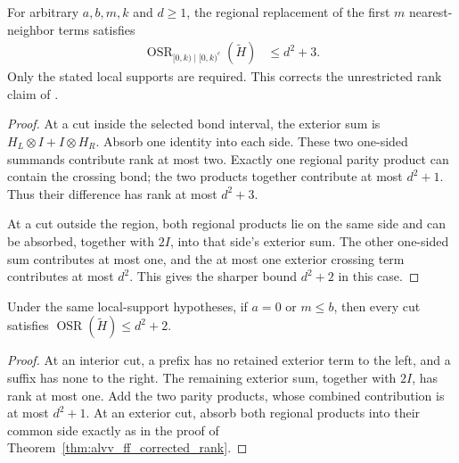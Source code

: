 \begin{theorem}
    \label{thm:alvv_ff_corrected_rank}
    \leanok
    For arbitrary $a,b,m,k$ and $d\ge1$, the regional replacement
    of the first $m$ nearest-neighbor terms satisfies
    \begin{align}
        \operatorname{OSR}_{\lbrack0,k)\mid\lbrack0,k)^c}(\widetilde H)
         & \le d^2+3.
        \label{eq:alvv_ff_corrected_rank}
    \end{align}
    Only the stated local supports are required.
    This corrects the unrestricted rank claim of
    \cite[Theorem~5.14(2)]{Arad2016RigorousRG}.
\end{theorem}
\begin{proof}\leanok
    At a cut inside the selected bond interval, the exterior sum is
    $H_L\otimes I+I\otimes H_R$. Absorb one identity into each side.
    These two one-sided summands contribute rank at most two.
    Exactly one regional parity product can contain the crossing bond;
    the two products together contribute at most $d^2+1$.
    Thus their difference has rank at most $d^2+3$.

    At a cut outside the region, both regional products lie on the same
    side and can be absorbed, together with $2I$, into that side's
    exterior sum. The other one-sided sum contributes at most one,
    and the at most one exterior crossing term contributes at most
    $d^2$. This gives the sharper bound $d^2+2$ in this case.
\end{proof}

\begin{lemma}
    \label{thm:alvv_ff_boundary_rank}
    \leanok
    Under the same local-support hypotheses, if $a=0$ or $m\le b$,
    then every cut satisfies
    $\operatorname{OSR}(\widetilde H)\le d^2+2$.
\end{lemma}
\begin{proof}\leanok
    At an interior cut, a prefix has no retained exterior term to the
    left, and a suffix has none to the right. The remaining exterior
    sum, together with $2I$, has rank at most one. Add the two parity
    products, whose combined contribution is at most $d^2+1$.
    At an exterior cut, absorb both regional products into their common
    side exactly as in the proof of
    Theorem~\ref{thm:alvv_ff_corrected_rank}.
\end{proof}

